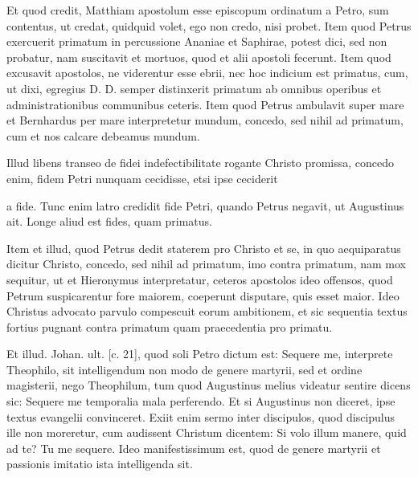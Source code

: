Et quod credit, Matthiam apostolum esse episcopum ordinatum a Petro, sum contentus, ut credat, quidquid volet, ego non credo, nisi probet. Item quod Petrus exercuerit primatum in percussione Ananiae et Saphirae, potest dici, sed non probatur, nam suscitavit et mortuos, quod et alii apostoli fecerunt. Item quod excusavit apostolos, ne viderentur esse ebrii, nec hoc indicium est primatus, cum, ut dixi, egregius D. D. semper distinxerit primatum ab omnibus operibus et administrationibus communibus ceteris. Item quod Petrus ambulavit super mare et Bernhardus per mare interpretetur mundum, concedo, sed nihil ad primatum, cum et nos calcare debeamus mundum.

Illud libens transeo de fidei indefectibilitate rogante Christo promissa, concedo enim, fidem Petri nunquam cecidisse, etsi ipse ceciderit

a fide. Tunc enim latro credidit fide Petri, quando Petrus negavit, ut Augustinus ait. Longe aliud est fides, quam primatus.

Item et illud, quod Petrus dedit staterem pro Christo et se, in quo aequiparatus dicitur Christo, concedo, sed nihil ad primatum, imo contra primatum, nam mox sequitur, ut et Hieronymus interpretatur, ceteros apostolos ideo offensos, quod Petrum suspicarentur fore maiorem, coeperunt disputare, quis esset maior. Ideo Christus advocato parvulo compescuit eorum ambitionem, et sic sequentia textus fortius pugnant contra primatum quam praecedentia pro primatu.

Et illud. Johan. ult. [c. 21], quod soli Petro dictum est: Sequere me, interprete Theophilo, sit intelligendum non modo de genere martyrii, sed et ordine magisterii, nego Theophilum, tum quod Augustinus melius videatur sentire dicens sic: Sequere me temporalia mala perferendo. Et si Augustinus non diceret, ipse textus evangelii convinceret. Exiit enim sermo inter discipulos, quod discipulus ille non moreretur, cum audissent Christum dicentem: Si volo illum manere, quid ad te? Tu me sequere. Ideo manifestissimum est, quod de genere martyrii et passionis imitatio ista intelligenda sit.

